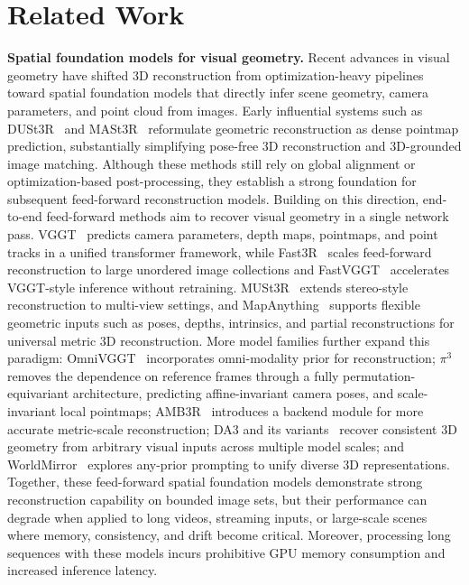 \section{Related Work}
\label{appendix:related}

\textbf{Spatial foundation models for visual geometry.}
Recent advances in visual geometry have shifted 3D reconstruction from optimization-heavy pipelines toward spatial foundation models that directly infer scene geometry, camera parameters, and point cloud from images. 
%
Early influential systems such as DUSt3R~\citep{wang2024dust3r} and MASt3R~\citep{leroy2024mast3r} reformulate geometric reconstruction as dense pointmap prediction, substantially simplifying pose-free 3D reconstruction and 3D-grounded image matching. 
%
Although these methods still rely on global alignment or optimization-based post-processing, they establish a strong foundation for subsequent feed-forward reconstruction models. 
%
Building on this direction, end-to-end feed-forward methods aim to recover visual geometry in a single network pass. 
%
VGGT~\citep{wang2025vggt} predicts camera parameters, depth maps, pointmaps, and point tracks in a unified transformer framework, while Fast3R~\citep{yang2025fast3r} scales feed-forward reconstruction to large unordered image collections and FastVGGT~\citep{shen2025fastvggt} accelerates VGGT-style inference without retraining. 
%
MUSt3R~\citep{cabon2025must3r} extends stereo-style reconstruction to multi-view settings, and MapAnything~\citep{keetha2026mapanything} supports flexible geometric inputs such as poses, depths, intrinsics, and partial reconstructions for universal metric 3D reconstruction. 
%
More model families further expand this paradigm: OmniVGGT~\citep{peng2025omnivggt} incorporates omni-modality prior for reconstruction; $\pi^3$ removes the dependence on reference frames through a fully permutation-equivariant architecture, predicting affine-invariant camera poses, and scale-invariant local pointmaps; AMB3R~\citep{wang2025amb3r} introduces a backend module for more accurate metric-scale reconstruction; DA3 and its variants~\citep{lin2025depth} recover consistent 3D geometry from arbitrary visual inputs across multiple model scales; and WorldMirror~\citep{liu2025worldmirror} explores any-prior prompting to unify diverse 3D representations. 
%
Together, these feed-forward spatial foundation models demonstrate strong reconstruction capability on bounded image sets, but their performance can degrade when applied to long videos, streaming inputs, or large-scale scenes where memory, consistency, and drift become critical.
%
Moreover, processing long sequences with these models incurs prohibitive GPU memory consumption and increased inference latency.


